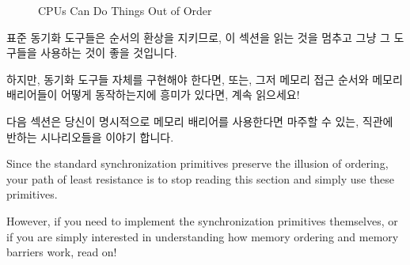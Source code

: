 \begin{figure}[htb]
\centering
{}
\caption{CPUs Can Do Things Out of Order}
\end{figure}

표준 동기화 도구들은 순서의 환상을 지키므로, 이 섹션을 읽는 것을 멈추고 그냥 그
도구들을 사용하는 것이 좋을 것입니다.

하지만, 동기화 도구들 자체를 구현해야 한다면, 또는, 그저 메모리 접근 순서와
메모리 배리어들이 어떻게 동작하는지에 흥미가 있다면, 계속 읽으세요!

다음 섹션은 당신이 명시적으로 메모리 배리어를 사용한다면 마주할 수 있는, 직관에
반하는 시나리오들을 이야기 합니다.
\iffalse

Since the standard synchronization primitives preserve the illusion of
ordering, your path of least resistance is to stop reading
this section and simply use these primitives.

However, if you need to implement the synchronization primitives
themselves, or if you are simply interested in understanding how memory
ordering and memory barriers work, read on!

